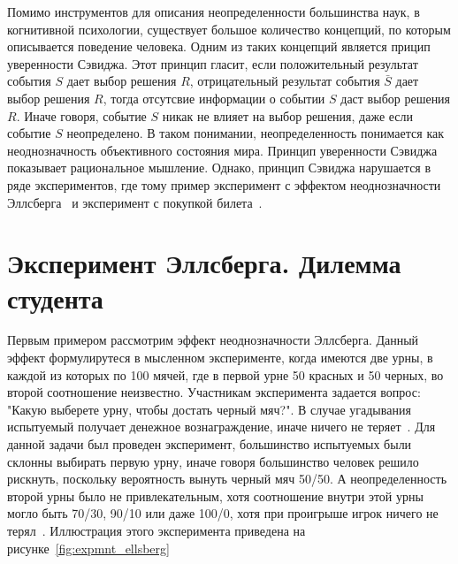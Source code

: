 Помимо инструментов для описания неопределенности большинства наук, в когнитивной психологии, существует большое
количество концепций, по которым описывается поведение человека. Одним из таких концепций
является прицип уверенности Сэвиджа. Этот принцип гласит, если положительный результат события $S$
дает выбор решения $R$, отрицательный результат события $\bar{S}$ дает выбор решения $R$, тогда
отсутсвие информации о событии $S$ даст выбор решения $R$. Иначе говоря, событие $S$ никак
не влияет на выбор решения, даже если событие $S$ неопределено. В таком понимании, неопределенность
понимается как неоднозначность объективного состояния мира. Принцип уверенности Сэвиджа показывает
рациональное мышление. Однако, принцип Сэвиджа нарушается в ряде экспериментов, где тому пример
эксперимент с эффектом неоднозначности Эллсберга~\citep{daniel1961risk} и эксперимент с покупкой
билета~\citep{tversky1992disjunction}.

\section{Эксперимент Эллсберга. Дилемма студента}

Первым примером рассмотрим эффект неоднозначности Эллсберга. Данный эффект формулирутеся
в мысленном эксперименте, когда имеются две урны, в каждой из которых по 100 мячей, где в первой
урне 50 красных и 50 черных, во второй соотношение неизвестно. Участникам эксперимента задается
вопрос: "Какую выберете урну, чтобы достать черный мяч?". В случае угадывания испытуемый получает денежное
вознаграждение, иначе ничего не теряет~\citep{daniel1961risk}. Для данной задачи был проведен эксперимент,
большинство испытуемых были склонны выбирать первую урну, иначе говоря большинство человек решило рискнуть,
поскольку вероятность вынуть черный мяч 50/50. А неопределенность второй урны было не привлекательным,
хотя соотношение внутри этой урны могло быть 70/30, 90/10 или даже 100/0, хотя при проигрыше игрок ничего
не терял~\citep{daniel1961risk,dominiak2012dynamic,camerer1992recent}. Иллюстрация этого эксперимента
приведена на рисунке~\ref{fig:expmnt_ellsberg}

